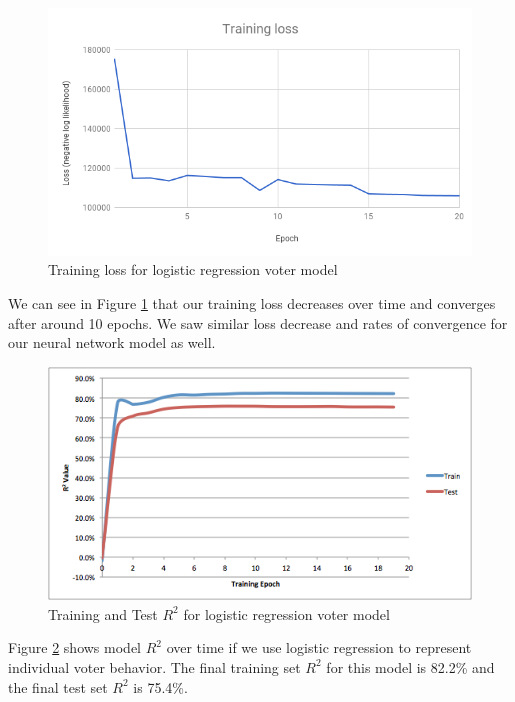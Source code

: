 \documentclass[10pt, letterpaper]{article}
\begin{document}
\begin{multicols}{2}
\begin{figure}[H]
\begin{center}
\includegraphics[scale=0.35]{training-loss}
\end{center}
\caption{Training loss for logistic regression voter model}
\label{fig:training-loss}
\end{figure}

We can see in Figure \ref{fig:training-loss} that our training loss decreases over time and converges after around 10 epochs. We saw similar loss decrease and rates of convergence for our neural network model as well.

\begin{figure}[H]
\begin{center}
\includegraphics[scale=0.35]{holdout-R2}
\end{center}
\caption{Training and Test $R^2$ for logistic regression voter model}
\label{fig:holdout-R2}
\end{figure}

Figure \ref{fig:holdout-R2} shows model $R^2$ over time if we use logistic regression to represent individual voter behavior. The final training set $R^2$ for this model is 82.2\% and the final test set $R^2$ is 75.4\%.


\end{multicols}
\end{document}
